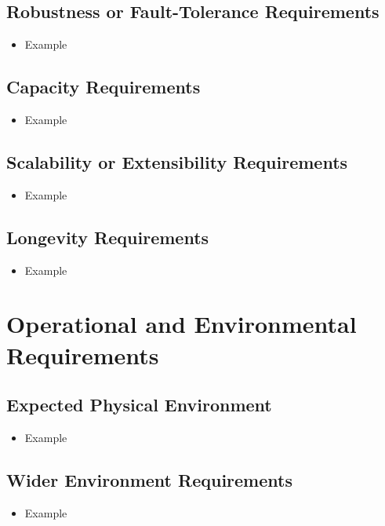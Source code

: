 \documentclass[12pt]{article}
\begin{document}
  \subsection{Robustness or Fault-Tolerance Requirements}
    \begin{itemize}
      \item Example
    \end{itemize}

  \subsection{Capacity Requirements}
    \begin{itemize}
      \item Example
    \end{itemize}

  \subsection{Scalability or Extensibility Requirements}
    \begin{itemize}
      \item Example
    \end{itemize}

  \subsection{Longevity Requirements}
    \begin{itemize}
      \item Example
    \end{itemize}

\section{Operational and Environmental Requirements}
  \subsection{Expected Physical Environment}
  \begin{itemize}
    \item Example
  \end{itemize}

  \subsection{Wider Environment Requirements}
    \begin{itemize}
      \item Example
    \end{itemize}
\end{document}
